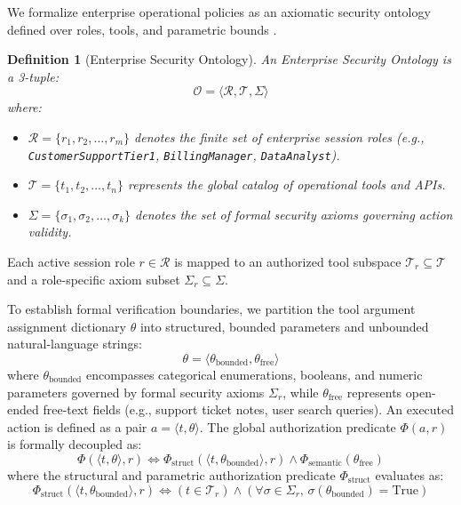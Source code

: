 \documentclass[preprint,12pt,3p]{elsarticle}
\newtheorem{definition}{Definition}
\begin{document}
We formalize enterprise operational policies as an axiomatic security ontology defined over roles, tools, and parametric bounds \cite{yang2024privilege, tiwari2025grammarenforced}.

\begin{definition}[Enterprise Security Ontology]
An Enterprise Security Ontology is a 3-tuple:
\begin{equation}
    \mathcal{O} = \langle \mathcal{R}, \mathcal{T}, \Sigma \rangle
\end{equation}
where:
\begin{itemize}
    \item $\mathcal{R} = \{r_1, r_2, \dots, r_m\}$ denotes the finite set of enterprise session roles (e.g., \texttt{CustomerSupportTier1}, \texttt{BillingManager}, \texttt{DataAnalyst}).
    \item $\mathcal{T} = \{t_1, t_2, \dots, t_n\}$ represents the global catalog of operational tools and APIs.
    \item $\Sigma = \{\sigma_1, \sigma_2, \dots, \sigma_k\}$ denotes the set of formal security axioms governing action validity.
\end{itemize}
\end{definition}

Each active session role $r \in \mathcal{R}$ is mapped to an authorized tool subspace $\mathcal{T}_r \subseteq \mathcal{T}$ and a role-specific axiom subset $\Sigma_r \subseteq \Sigma$. 

To establish formal verification boundaries, we partition the tool argument assignment dictionary $\theta$ into structured, bounded parameters and unbounded natural-language strings:
\begin{equation}
    \theta = \langle \theta_{\text{bounded}}, \theta_{\text{free}} \rangle
\end{equation}
where $\theta_{\text{bounded}}$ encompasses categorical enumerations, booleans, and numeric parameters governed by formal security axioms $\Sigma_r$, while $\theta_{\text{free}}$ represents open-ended free-text fields (e.g., support ticket notes, user search queries). An executed action is defined as a pair $a = \langle t, \theta \rangle$. The global authorization predicate $\Phi(a, r)$ is formally decoupled as:
\begin{equation}
    \Phi(\langle t, \theta \rangle, r) \iff \Phi_{\text{struct}}(\langle t, \theta_{\text{bounded}} \rangle, r) \land \Phi_{\text{semantic}}(\theta_{\text{free}})
\end{equation}
where the structural and parametric authorization predicate $\Phi_{\text{struct}}$ evaluates as:
\begin{equation}
    \Phi_{\text{struct}}(\langle t, \theta_{\text{bounded}} \rangle, r) \iff \left( t \in \mathcal{T}_r \right) \land \left( \forall \sigma \in \Sigma_r, \, \sigma(\theta_{\text{bounded}}) = \text{True} \right)
\end{equation}
\end{document}
